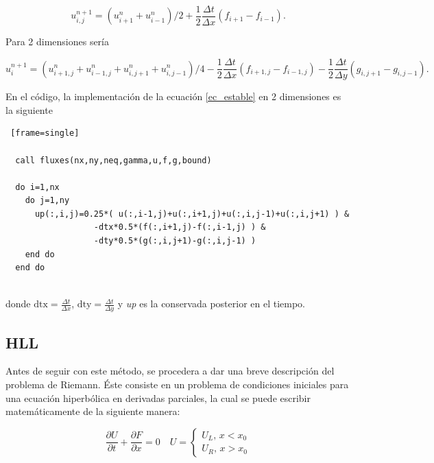 \documentclass[12pt,a4paper]{book}
\begin{document}
\begin{equation}\label{ec_estable}
  u_{i,j}^{n+1} =(u_{i+1}^n+u_{i-1}^n)/2 + \frac{1}{2}\frac{\Delta t}{\Delta x} \left(f_{i+1} - f_{i-1} \right).
\end{equation}

\noindent Para 2 dimensiones sería

\begin{equation}\label{ec_estable_2D}
  u_i^{n+1} =(u_{i+1,j}^n+u_{i-1,j}^n+u_{i,j+1}^n+u_{i,j-1}^n)/4 - \frac{1}{2}\frac{\Delta t}{\Delta x} \left(f_{i+1,j} - f_{i-1,j} \right)-\frac{1}{2}\frac{\Delta t}{\Delta y} \left(g_{i,j+1} - g_{i,j-1} \right).
\end{equation}

En el código, la implementación de la ecuación \ref{ec_estable} en 2 dimensiones es la siguiente

\begin{lstlisting} [frame=single]

  call fluxes(nx,ny,neq,gamma,u,f,g,bound)

  do i=1,nx
    do j=1,ny
      up(:,i,j)=0.25*( u(:,i-1,j)+u(:,i+1,j)+u(:,i,j-1)+u(:,i,j+1) ) &
                  -dtx*0.5*(f(:,i+1,j)-f(:,i-1,j) ) &
                  -dty*0.5*(g(:,i,j+1)-g(:,i,j-1) )
    end do
  end do
  
\end{lstlisting}

\noindent donde $\text{dtx} = \frac{\Delta t}{\Delta x}$, $\text{dty} = \frac{\Delta t}{\Delta y}$ y \emph{up} es la conservada posterior en el tiempo.



\subsection{HLL} \label{secc:HLL}
Antes de seguir con este método, se procedera a dar una breve descripción del problema de Riemann. Éste consiste en un problema de condiciones iniciales para una ecuación hiperbólica en derivadas parciales, la cual
se puede escribir matemáticamente de la siguiente manera: 

\begin{equation}
  \frac{\partial U}{\partial t}+\frac{\partial F}{\partial x}=0 \quad U=\left\{\begin{array}{l}
  U_{L}, \, x<x_{0} \\
  U_{R}, \, x>x_{0} 
  \end{array}\right.
\end{equation}
\end{document}
